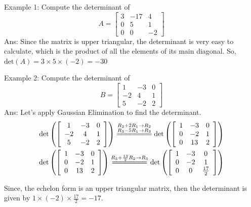 \documentclass[conference,final,11pt,technote,onecolumn]{IEEEtran}\usepackage[]{graphicx}\usepackage[]{color}
\begin{document}
Example 1: Compute the determinant of 
\[ A =  \left[ \begin{array}{ccc}
3 & -17 & 4\\
0 & 5 & 1\\
0 & 0 & -2
\end{array} \right] \]
Ans: Since the matrix is upper triangular, the determinant is very easy to calculate, which is the product of all the elements of its main diagonal. So, $\text{det}(A) = 3\times 5 \times (-2) = -30$

Example 2: Compute the determinant of 
\[ 
	B = \left[ 
		\begin{array}{ccc}
			1 & -3 & 0\\
			-2 & 4 & 1\\
			5 & -2 & 2
		\end{array}
	\right]
\]
Ans: Let's apply Gaussian Elimination to find the determinant.
 \begin{eqnarray}
 \nonumber \text{det}\left( \left[ 
 		\begin{array}{ccc}
 			1 & -3 & 0\\
 			-2 & 4 & 1\\
 			5 & -2 & 2
 		\end{array}
 	\right]\right) \stackrel{\substack{R_2+2R_1\rightarrow R_2\\R_3-5R_1\rightarrow R_3}}{=\joinrel=\joinrel=\joinrel=\joinrel=\joinrel=\joinrel=\joinrel=} \text{det}\left( \left[ 
 		\begin{array}{ccc}
 			1 & -3 & 0\\
 			0 & -2 & 1\\
 			0 & 13 & 2
 		\end{array}
 	\right]\right)\\
\nonumber \text{det}\left( \left[ 
 		\begin{array}{ccc}
 			1 & -3 & 0\\
 			0 & -2 & 1\\
 			0 & 13 & 2
 		\end{array}
 	\right]\right) \stackrel{\substack{R_3+\frac{13}{2}R_2\rightarrow R_3}}{=\joinrel=\joinrel=\joinrel=\joinrel=\joinrel=\joinrel=\joinrel=} 
 	\text{det}\left( \left[ 
 		\begin{array}{ccc}
 			1 & -3 & 0\\
 			0 & -2 & 1\\
 			0 & 0 & \frac{17}{2}
 		\end{array}
 		\right] \right)
\end{eqnarray}

Since, the echelon form is an upper triangular matrix, then the determinant is given by $1\times (-2)\times \frac{17}{2} = -17$.
\end{document}
